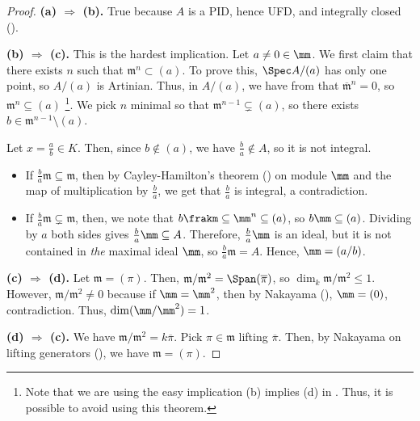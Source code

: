 \begin{proof}
    \textbf{(a) $\Rightarrow$ (b).}
    True because $A$ is a PID, hence UFD,
    and integrally closed ().

    \textbf{(b) $\Rightarrow$ (c).}
    This is the hardest implication.
    Let $a\neq 0\in \mm$.
    We first claim that
    there exists $n$ such that $\mathfrak m^n\subset (a)$.
    To prove this, $\Spec A/(a)$ has only one point,
    so $A/(a)$ is Artinian. 
    Thus, in $A/(a)$, we have from 
     that $\overline{\mathfrak m}^n=0$,
    so $\mathfrak m^n\subseteq (a)$%
    \footnote{Note that we are using the easy implication (b) implies (d) in .
    Thus, it is possible to avoid using this theorem.}.
    We pick $n$ minimal so that $\mathfrak m^{n-1}\subsetneq (a)$,
    so there exists $b\in\mathfrak m^{n-1}\setminus (a)$.

    Let $x=\frac ab\in K$. Then, since $b\notin (a)$,
    we have $\frac ba\notin A$,
    so it is not integral.
    \begin{itemize}
	\item If $\frac ba\mathfrak m\subseteq\mathfrak m$,
    then by Cayley-Hamilton's theorem ()
    on module $\mm$ and the map of multiplication by $\frac ba$,
    we get that $\frac ba$ is integral, a contradiction.
	\item If $\frac ba\mathfrak m\subsetneq\mathfrak m$,
    then, we note that $b\frakm \subseteq \mm^n\subseteq (a)$,
    so $b\mm \subseteq (a)$. Dividing by $a$ both sides
    gives $\tfrac ba\mm\subseteq A$.
    Therefore, $\frac ba\mm$ is an ideal,
    but it is not contained in \textit{the} maximal ideal $\mm$,
    so $\frac ba\mathfrak m = A$. Hence, $\mm = (a/b)$.
    \end{itemize}

    \textbf{(c) $\Rightarrow$ (d).}
    Let $\mathfrak m = (\pi)$.
    Then, $\mathfrak m/\mathfrak m^2 = \Span(\overline\pi)$,
    so $\dim_k\mathfrak m /\mathfrak m^2\leq 1$.
    However, $\mathfrak m / \mathfrak m^2\neq 0$ because if
    $\mm=\mm^2$, then by Nakayama (),
    $\mm=(0)$, contradiction.
    Thus, $\dim(\mm / \mm^2) = 1$.

    \textbf{(d) $\Rightarrow$ (c).}
    We have $\mathfrak m/\mathfrak m^2 = k\overline\pi$.
    Pick $\pi\in\mathfrak m$ lifting $\overline\pi$.
    Then, by Nakayama on lifting generators (),
    we have $\mathfrak m=(\pi)$.


\end{proof}

